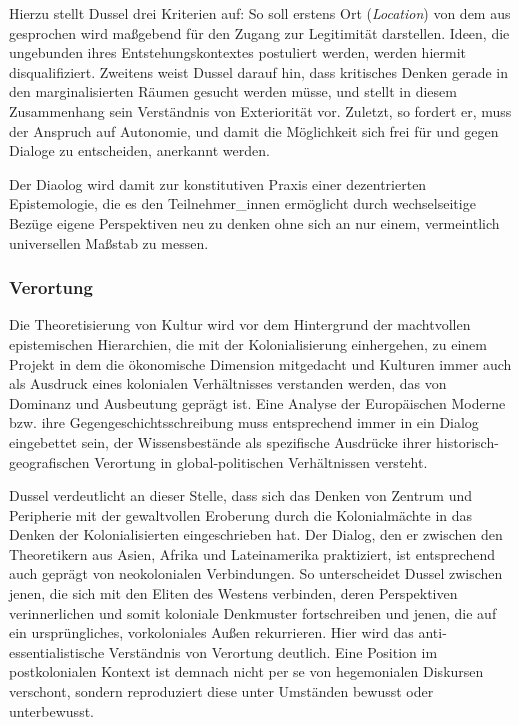 Hierzu stellt Dussel drei Kriterien auf: So soll erstens Ort (\textit{Location}) von dem
aus gesprochen wird maßgebend für den Zugang zur Legitimität darstellen. Ideen,
die ungebunden ihres Entstehungskontextes postuliert werden, werden hiermit
disqualifiziert. Zweitens weist Dussel darauf hin, dass kritisches Denken gerade
in den marginalisierten Räumen gesucht werden müsse, und stellt in diesem
Zusammenhang sein Verständnis von Exteriorität vor. Zuletzt, so fordert er, muss
der Anspruch auf Autonomie, und damit die Möglichkeit sich frei für und gegen
Dialoge zu entscheiden, anerkannt werden.

Der Diaolog wird damit zur konstitutiven Praxis einer dezentrierten
Epistemologie, die es den Teilnehmer\_innen ermöglicht durch wechselseitige
Bezüge eigene Perspektiven neu zu denken ohne sich an nur einem, vermeintlich
universellen Maßstab zu messen.

\subsubsection{Verortung}

Die Theoretisierung von Kultur wird vor dem Hintergrund der machtvollen
epistemischen Hierarchien, die mit der Kolonialisierung einhergehen, zu einem
Projekt in dem die ökonomische Dimension mitgedacht und Kulturen immer auch als
Ausdruck eines kolonialen Verhältnisses verstanden werden, das von Dominanz und
Ausbeutung geprägt ist.\footnotemark {} Eine Analyse der Europäischen Moderne bzw. ihre
Gegengeschichtsschreibung muss entsprechend immer in ein Dialog eingebettet
sein, der Wissensbestände als spezifische Ausdrücke ihrer
historisch-geografischen Verortung in global-politischen Verhältnissen versteht.

Dussel verdeutlicht an dieser Stelle, dass sich das Denken von Zentrum und
Peripherie mit der gewaltvollen Eroberung durch die Kolonialmächte in das Denken
der Kolonialisierten eingeschrieben hat. Der Dialog, den er zwischen den
Theoretikern aus Asien, Afrika und Lateinamerika praktiziert, ist entsprechend
auch geprägt von neokolonialen Verbindungen. So unterscheidet Dussel zwischen
jenen, die sich mit den Eliten des Westens verbinden, deren Perspektiven
verinnerlichen und somit koloniale Denkmuster fortschreiben und jenen, die auf
ein ursprüngliches, vorkoloniales Außen rekurrieren. Hier wird das
anti-essentialistische Verständnis von Verortung deutlich. Eine Position im
postkolonialen Kontext\footnotemark {} ist demnach nicht per se von hegemonialen Diskursen
verschont, sondern reproduziert diese unter Umständen bewusst oder unterbewusst.


